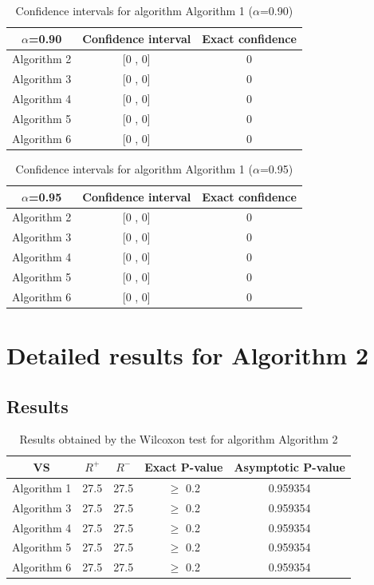 \documentclass[a4paper,10pt]{article}
\begin{document}
\begin{table}[!htp]
\centering\small
\begin{tabular}{
|c|c|c|}
\hline
 $\alpha$=0.90 & Confidence interval & Exact confidence \\ \hline 
Algorithm 2 & [0 , 0] & 0\\ \hline 
Algorithm 3 & [0 , 0] & 0\\ \hline 
Algorithm 4 & [0 , 0] & 0\\ \hline 
Algorithm 5 & [0 , 0] & 0\\ \hline 
Algorithm 6 & [0 , 0] & 0\\ \hline 

\end{tabular}
\caption{Confidence intervals for algorithm Algorithm 1 ($\alpha$=0.90)}
\end{table}
\begin{table}[!htp]
\centering\small
\begin{tabular}{
|c|c|c|}
\hline
 $\alpha$=0.95 & Confidence interval & Exact confidence \\ \hline 
Algorithm 2 & [0 , 0] & 0\\ \hline 
Algorithm 3 & [0 , 0] & 0\\ \hline 
Algorithm 4 & [0 , 0] & 0\\ \hline 
Algorithm 5 & [0 , 0] & 0\\ \hline 
Algorithm 6 & [0 , 0] & 0\\ \hline 

\end{tabular}
\caption{Confidence intervals for algorithm Algorithm 1 ($\alpha$=0.95)}
\end{table}

 \clearpage 


\section{Detailed results for Algorithm 2}


\subsection{Results}

\begin{table}[!htp]
\centering\small
\begin{tabular}{
|c|c|c|c|c|}
\hline
 VS & $R^{+}$ & $R^{-}$ & Exact P-value & Asymptotic P-value \\ \hline 
Algorithm 1 & 27.5 & 27.5 & $\geq$ 0.2 & 0.959354\\ \hline 
Algorithm 3 & 27.5 & 27.5 & $\geq$ 0.2 & 0.959354\\ \hline 
Algorithm 4 & 27.5 & 27.5 & $\geq$ 0.2 & 0.959354\\ \hline 
Algorithm 5 & 27.5 & 27.5 & $\geq$ 0.2 & 0.959354\\ \hline 
Algorithm 6 & 27.5 & 27.5 & $\geq$ 0.2 & 0.959354\\ \hline 

\end{tabular}
\caption{Results obtained by the Wilcoxon test for algorithm Algorithm 2}
\end{table}
\end{document}
